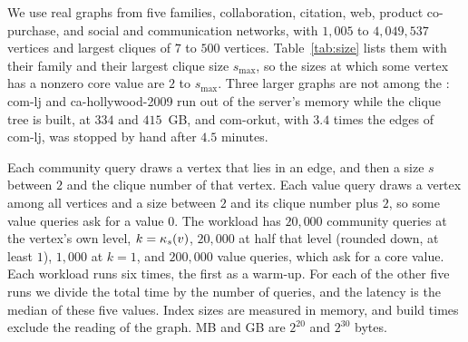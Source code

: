 We use \numgraphs{} real graphs from five families, collaboration, citation, web, product co-purchase, and social and communication networks, with $1{,}005$ to $4{,}049{,}537$ vertices and largest cliques of $7$ to $500$ vertices.
%
Table~\ref{tab:size} lists them with their family and their largest clique size $s_{\max}$, so the sizes at which some vertex has a nonzero core value are $2$ to $s_{\max}$.
%
Three larger graphs are not among the \numgraphs{}: \textsf{com-lj} and \textsf{ca-hollywood-2009} run out of the server's memory while the clique tree is built, at $334$ and $415$~GB, and \textsf{com-orkut}, with $3.4$ times the edges of \textsf{com-lj}, was stopped by hand after $4.5$ minutes.

Each community query draws a vertex that lies in an edge, and then a size $s$ between $2$ and the clique number of that vertex.
%
Each value query draws a vertex among all vertices and a size between $2$ and its clique number plus $2$, so some value queries ask for a value $0$.
%
The workload has $20{,}000$ community queries at the vertex's own level, $k=\kappa_{s}(v)$, $20{,}000$ at half that level (rounded down, at least $1$), $1{,}000$ at $k=1$, and $200{,}000$ value queries, which ask for a core value.
%
Each workload runs six times, the first as a warm-up.
%
For each of the other five runs we divide the total time by the number of queries, and the latency is the median of these five values.
%
Index sizes are measured in memory, and build times exclude the reading of the graph.
%
MB and GB are $2^{20}$ and $2^{30}$ bytes.

